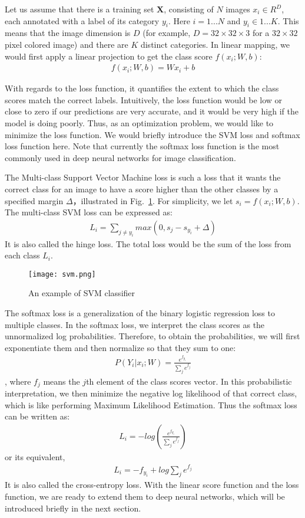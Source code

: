 Let us assume that there is a training set $\mathbf{X}$, consisting of $N$ images $x_i \in R^D$, each annotated with a label of its category $y_i$. Here $i = 1 ...N$ and $y_i \in 1 ... K$. This means that the image dimension is $D$ (for example, $D=32\times32\times3$ for a $32\times32$ pixel colored image) and there are $K$ distinct categories. In linear mapping, we would first apply a linear projection to get the class score $f(x_i; W, b)$:
\begin{align}
f(x_i; W, b) = Wx_i + b
\end{align}

With regards to the loss function, it quantifies the extent to which the class scores match the correct labels. Intuitively, the loss function would be low or close to zero if our predictions are very accurate, and it would be very high if the model is doing poorly. Thus, as an optimization problem, we would like to minimize the loss function. We would briefly introduce the SVM loss and softmax loss function here. Note that currently the softmax loss function is the most commonly used in deep neural networks for image classification.

The Multi-class Support Vector Machine loss is such a loss that it wants the correct class for an image to have a score higher than the other classes by a specified margin $\Delta$，illustrated in Fig.~\ref{fig:svm}. For simplicity, we let $s_i = f(x_i; W, b)$. The multi-class SVM loss can be expressed as:
\begin{align}L_i = \sum_{j\neq y_i} max(0, s_j - s_{y_i} + \Delta)\end{align}
It is also called the hinge loss. The total loss would be the sum of the loss from each class $L_i$.
\begin{figure}[!htp]
	\centering
	\texttt{[image: svm.png]}
	\caption[An example of SVM classifier]
	{An example of SVM classifier}
	\label{fig:svm}
\end{figure}
The softmax loss is a generalization of the binary logistic regression loss to multiple classes. In the softmax loss, we interpret the class scores as the unnormalized log probabilities. Therefore, to obtain the probabilities, we will first exponentiate them and then normalize so that they sum to one: 
\begin{align}
P(Y_i|x_i;W) = \frac{e^{f_{y_i}}}{\sum_j e^{f_j}}
\end{align}, where $f_j$ means the $j$th element of the class scores vector.
In this probabilistic interpretation, we then minimize the negative log likelihood of that correct class, which is like performing Maximum Likelihood Estimation. Thus the softmax loss can be written as:
\begin{align}L_i = -log\left( \frac{e^{f_{y_i}}}{\sum_j e^{f_j}}\right)\end{align}
or its equivalent,
\begin{align} L_i = -f_{y_i} + log \sum_j e^{f_j}\end{align}
It is also called the cross-entropy loss. With the linear score function and the loss function, we are ready to extend them to deep neural networks, which will be introduced briefly in the next section.



